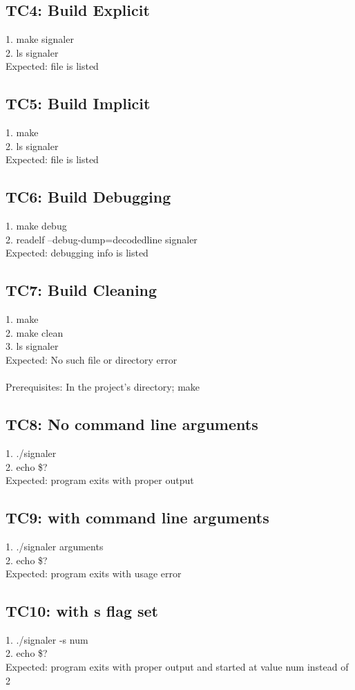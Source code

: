 \documentclass{article}
\begin{document}
  \subsection*{TC4: Build Explicit}
1. make signaler\\
2. ls signaler\\
Expected: file is listed\\

\subsection*{TC5: Build Implicit}
1. make\\
2. ls signaler\\
Expected: file is listed\\
\subsection*{TC6: Build Debugging}
1. make debug\\
2. readelf --debug-dump=decodedline signaler\\
Expected: debugging info is listed\\
\subsection*{TC7: Build Cleaning}
1. make\\
2. make clean\\
3. ls signaler\\
Expected: No such file or directory error\\
\\
Prerequisites: In the project's directory; make\\
\subsection*{TC8: No command line arguments}
1. ./signaler\\
2. echo \$?\\
Expected: program exits with proper output \\
\subsection*{TC9: with command line arguments}
1. ./signaler arguments\\
2. echo \$?\\
Expected: program exits with usage error\\
\subsection*{TC10: with s flag set}
1. ./signaler -s num\\
2. echo \$?\\
Expected: program exits with proper output and started at value num instead of 2\\
\end{document}
